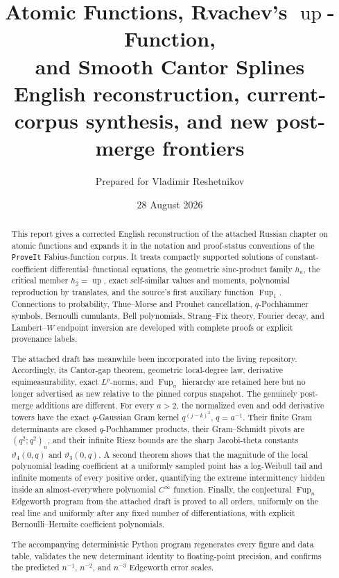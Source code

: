 \documentclass[11pt,oneside]{article}
\title{\textbf{Atomic Functions, Rvachev's \(\operatorname{up}\)-Function,\\and Smooth Cantor Splines}\\[0.7em]
\large English reconstruction, current-corpus synthesis, and new post-merge frontiers}
\author{Prepared for Vladimir Reshetnikov}
\date{28 August 2026}
\theoremstyle{definition}
\theoremstyle{remark}
\newcommand{\Up}{\operatorname{up}}
\newcommand{\Fup}{\operatorname{Fup}}
\begin{document}
\maketitle

\begin{abstract}
This report gives a corrected English reconstruction of the attached Russian chapter on atomic
functions and expands it in the notation and proof-status conventions of the
\texttt{ProveIt} Fabius-function corpus.  It treats compactly supported solutions of
constant-coefficient differential--functional equations, the geometric sinc-product family
\(h_a\), the critical member \(h_2=\Up\), exact self-similar values and moments, polynomial
reproduction by translates, and the source's first auxiliary function \(\Fup_1\).  Connections
to probability, Thue--Morse and Prouhet cancellation, \(q\)-Pochhammer symbols, Bernoulli
cumulants, Bell polynomials, Strang--Fix theory, Fourier decay, and Lambert--\(W\) endpoint
inversion are developed with complete proofs or explicit provenance labels.

The attached draft has meanwhile been incorporated into the living repository.  Accordingly,
its Cantor-gap theorem, geometric local-degree law, derivative equimeasurability, exact
\(L^p\)-norms, and \(\Fup_n\) hierarchy are retained here but no longer advertised as new
relative to the pinned corpus snapshot.  The genuinely post-merge additions are different.
For every \(a>2\), the normalized even and odd derivative towers have the exact
\(q\)-Gaussian Gram kernel \(q^{(j-k)^2}\), \(q=a^{-1}\).  Their finite Gram determinants are
closed \(q\)-Pochhammer products, their Gram--Schmidt pivots are
\((q^2;q^2)_n\), and their infinite Riesz bounds are the sharp Jacobi-theta constants
\(\vartheta_4(0,q)\) and \(\vartheta_3(0,q)\).  A second theorem shows that the magnitude of
the local polynomial leading coefficient at a uniformly sampled point has a log-Weibull tail
and infinite moments of every positive order, quantifying the extreme intermittency hidden
inside an almost-everywhere polynomial \(C^\infty\) function.  Finally, the conjectural
\(\Fup_n\) Edgeworth program from the attached draft is proved to all orders, uniformly on the
real line and uniformly after any fixed number of differentiations, with explicit
Bernoulli--Hermite coefficient polynomials.

The accompanying deterministic Python program regenerates every figure and data table,
validates the new determinant identity to floating-point precision, and confirms the predicted
\(n^{-1}\), \(n^{-2}\), and \(n^{-3}\) Edgeworth error scales.
\end{abstract}
\end{document}
